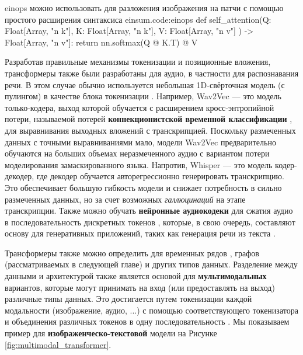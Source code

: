 \begin{mypy}{einops можно использовать для разложения изображения на патчи с помощью простого расширения синтаксиса einsum.}{code:einops}
def self_attention(Q: Float[Array, "n k"], 
                   K: Float[Array, "n k"], 
                   V: Float[Array, "n v"]
                 ) -> Float[Array, "n v"]:
	return nn.softmax(Q @ K.T) @ V
\end{mypy}

Разработав правильные механизмы токенизации и позиционные вложения, трансформеры также были разработаны для аудио, в частности для распознавания речи. В этом случае обычно используется небольшая 1D-свёрточная модель (с пулингом) в качестве блока токенизации \cite{baevski2020wav2vec,radford2023robust}. Например, Wav2Vec \cite{baevski2020wav2vec} — это модель только-кодера, выход которой обучается с расширением кросс-энтропийной потери, называемой потерей \textbf{коннекционистской временной классификации} \cite{graves2012connectionction}, для выравнивания выходных вложений с транскрипцией. Поскольку размеченных данных с точными выравниваниями мало, модели Wav2Vec предварительно обучаются на больших объемах неразмеченного аудио с вариантом потери моделирования замаскированного языка. Напротив, Whisper \cite{radford2023robust} — это модель кодер-декодер, где декодер обучается авторегрессионно генерировать транскрипцию. Это обеспечивает большую гибкость модели и снижает потребность в сильно размеченных данных, но за счет возможных \textit{галлюцинаций} на этапе транскрипции. Также можно обучать \textbf{нейронные аудиокодеки} для сжатия аудио в последовательность дискретных токенов \cite{defossez2022high}, которые, в свою очередь, составляют основу для генеративных приложений, таких как генерация речи из текста \cite{wang2023neural}.

Трансформеры также можно определить для временных рядов \cite{ansari2024chronos}, графов (рассматриваемых в следующей главе) и других типов данных. Разделение между данными и архитектурой также является основой для \textbf{мультимодальных} вариантов, которые могут принимать на вход (или предоставлять на выход) различные типы данных. Это достигается путем токенизации каждой модальности (изображение, аудио, ...) с помощью соответствующего токенизатора и объединения различных токенов в одну последовательность \cite{bordes2024introduction}. Мы показываем пример для \textbf{изображенческо-текстовой} модели на Рисунке \ref{fig:multimodal_transformer}.

